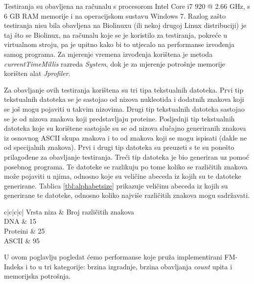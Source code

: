Testiranja su obavljena na računalu s procesorom Intel Core i7 920 @ 2.66 GHz, s 6 GB RAM memorije i na operacijskom sustavu Windows 7. Razlog zašto testiranja nisu bila obavljena na Biolinuxu (ili nekoj drugoj Linux distribuciji) je taj što se Biolinux, na računalu koje se je koristilo za testiranja, pokreće u virtualnom stroju, pa je upitno kako bi to utjecalo na performanse izvođenja samog programa. Za mjerenje vremena izvođenja korištena je metoda \textit{currentTimeMillis} razreda \textit{System}, dok je za mjerenje potrošnje memorije korišten alat \textit{Jprofiler}.

Za obavljanje ovih testiranja korištena su tri tipa tekstualnih datoteka. Prvi tip tekstualnih datoteka se je sastojao od nizova nukleotida i dodatnih znakova koji se još mogu pojaviti u takvim nizovima. Drugi tip tekstualnih datoteka sastojao se je od nizova znakova koji predstavljaju proteine. Posljednji tip tekstualnih datoteka koje su korištene sastojale su se od nizova slučajno generiranih znakova iz osnovnog ASCII skupa znakova i to od znakova koji se mogu ispisati (dakle ne od specijalnih znakova). Prvi i drugi tip datoteka su preuzeti s \cite{corpus} te su ponešto prilagođene za obavljanje testiranja. Treći tip datoteka je bio generiran uz pomoć posebnog programa. Te datoteke se razlikuju po tome koliko se različitih znakova može pojaviti u njima, odnosno koje su veličine abeceda iz kojih su te datoteke generirane. Tablica \ref{tbl:alphabetsize} prikazuje veličinu abeceda iz kojih su generirane te datoteke, odnosno koliko najviše različitih znakova mogu sadržavati. 

\begin{table}[h]
\caption{Maksimalna veličina abecede pojedinih datoteka}
\label{tbl:alphabetsize}
\centering\begin{tabular}{c|c|c|c|}
 \hline
{} {Vrsta niza} & Broj različitih znakova   \\ \hline
{} {   DNA   }		&	15		\\ \hline
{} {   Proteini   }	&	25		\\ \hline
{} {   ASCII   }	&	95		\\ \hline
\end{tabular}
\end{table}


U ovom poglavlju pogledat ćemo performanse koje pruža implementirani FM-Indeks i to u tri kategorije: brzina izgradnje, brzina obavljanja \textit{count} upita i memorijska potrošnja.

